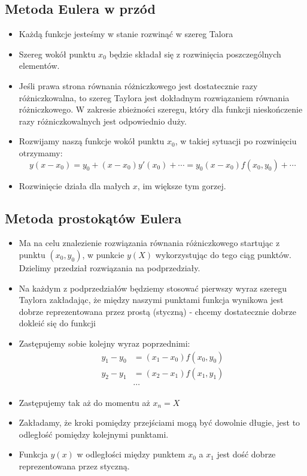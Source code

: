 \documentclass[a4paper]{article}
\begin{document}
\subsection{Metoda Eulera w przód}
\begin{itemize}
    \item Każdą funkcje jesteśmy w stanie rozwinąć w szereg Talora
    \item Szereg wokół punktu $x_0$ będzie składał się z rozwinięcia poszczególnych elementów.
    \item Jeśli prawa strona równania różniczkowego jest dostatecznie razy różniczkowalna, to szereg Taylora jest dokładnym rozwiązaniem równania różniczkowego. W zakresie zbieżności szeregu, który dla funkcji nieskończenie razy różniczkowalnych jest odpowiednio duży.
    \item Rozwijamy naszą funkcje wokół punktu $x_0$, w takiej sytuacji po rozwinięciu otrzymamy:
    \begin{equation*}
        y(x-x_0)=y_0 +(x-x_0)y'(x_0)+ \cdots = y_0 (x-x_0)f(x_0,y_0) + \cdots
    \end{equation*}
    \item Rozwinięcie działa dla małych $x$, im większe tym gorzej.
\end{itemize}

\subsection{Metoda prostokątów Eulera}
\begin{itemize}
    \item Ma na celu znalezienie rozwiązania równania różniczkowego startując z punktu $(x_0, y_0)$, w punkcie $y(X)$ wykorzystując do tego ciąg punktów. Dzielimy przedział rozwiązania na podprzedziały.
    \item Na każdym z podprzedziałów będziemy stosować pierwszy wyraz szeregu Taylora zakładając, że między naszymi punktami funkcja wynikowa jest dobrze reprezentowana przez prostą (styczną) - chcemy dostatecznie dobrze dokleić się do funkcji
    \item Zastępujemy sobie kolejny wyraz poprzednimi:
    \begin{equation*}
        \begin{split}
            y_1 - y_0 & = (x_1-x_0)f(x_0,y_0) \\
            y_2 - y_1 & = (x_2-x_1)f(x_1,y_1) \\
            & \cdots
        \end{split}
    \end{equation*}
    \item Zastępujemy tak aż do momentu aż $x_n = X$
    \item Zakładamy, że kroki pomiędzy przejściami mogą być dowolnie długie, jest to odległość pomiędzy kolejnymi punktami.
    \item Funkcja $y(x)$ w odległości między punktem $x_0$ a $x_1$ jest dość dobrze reprezentowana przez styczną.
\end{itemize}
\end{document}
